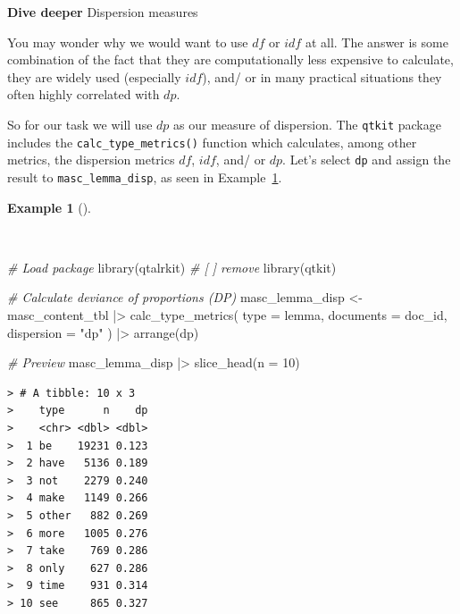 \documentclass[
  letterpaper,
]{latex/krantz}
\newenvironment{Shaded}{\begin{snugshade}}{\end{snugshade}}
\newcommand{\AttributeTok}[1]{\textcolor[rgb]{0.00,0.00,0.00}{#1}}
\newcommand{\CommentTok}[1]{\textcolor[rgb]{0.00,0.00,0.00}{\textit{#1}}}
\newcommand{\DecValTok}[1]{\textcolor[rgb]{0.00,0.00,0.00}{#1}}
\newcommand{\FunctionTok}[1]{\textcolor[rgb]{0.00,0.00,0.00}{#1}}
\newcommand{\NormalTok}[1]{\textcolor[rgb]{0.00,0.00,0.00}{#1}}
\newcommand{\OtherTok}[1]{\textcolor[rgb]{0.00,0.00,0.00}{#1}}
\newcommand{\SpecialCharTok}[1]{\textcolor[rgb]{0.00,0.00,0.00}{#1}}
\newcommand{\StringTok}[1]{\textcolor[rgb]{0.00,0.00,0.00}{#1}}
\theoremstyle{definition}
\newtheorem{example}{Example}[chapter]
\theoremstyle{remark}
\begin{document}
\begin{tcolorbox}[enhanced jigsaw, colframe=quarto-callout-color-frame, breakable, bottomrule=.15mm, arc=.35mm, left=2mm, opacityback=0, rightrule=.15mm, colback=white, toprule=.15mm, leftrule=.75mm]

\textbf{ Dive deeper} Dispersion measures

You may wonder why we would want to use \(df\) or \(idf\) at all. The
answer is some combination of the fact that they are computationally
less expensive to calculate, they are widely used (especially \(idf\)),
and/ or in many practical situations they often highly correlated with
\(dp\).

\end{tcolorbox}

So for our task we will use \(dp\) as our measure of dispersion. The
\texttt{qtkit} package includes the \texttt{calc\_type\_metrics()}
function which calculates, among other metrics, the dispersion metrics
\(df\), \(idf\), and/ or \(dp\). Let's select \texttt{dp} and assign the
result to \texttt{masc\_lemma\_disp}, as seen in
Example~\ref{exm-eda-masc-dp}.

\begin{example}[]\protect\hypertarget{exm-eda-masc-dp}{}\label{exm-eda-masc-dp}

~

\begin{Shaded}
\begin{Highlighting}[]
\CommentTok{\# Load package}
\FunctionTok{library}\NormalTok{(qtalrkit) }\CommentTok{\# [ ] remove}
\FunctionTok{library}\NormalTok{(qtkit)}

\CommentTok{\# Calculate deviance of proportions (DP)}
\NormalTok{masc\_lemma\_disp }\OtherTok{\textless{}{-}}
\NormalTok{  masc\_content\_tbl }\SpecialCharTok{|\textgreater{}}
  \FunctionTok{calc\_type\_metrics}\NormalTok{(}
    \AttributeTok{type =}\NormalTok{ lemma,}
    \AttributeTok{documents =}\NormalTok{ doc\_id,}
    \AttributeTok{dispersion =} \StringTok{"dp"}
\NormalTok{  ) }\SpecialCharTok{|\textgreater{}}
  \FunctionTok{arrange}\NormalTok{(dp)}

\CommentTok{\# Preview}
\NormalTok{masc\_lemma\_disp }\SpecialCharTok{|\textgreater{}}
  \FunctionTok{slice\_head}\NormalTok{(}\AttributeTok{n =} \DecValTok{10}\NormalTok{)}
\end{Highlighting}
\end{Shaded}

\begin{verbatim}
> # A tibble: 10 x 3
>    type      n    dp
>    <chr> <dbl> <dbl>
>  1 be    19231 0.123
>  2 have   5136 0.189
>  3 not    2279 0.240
>  4 make   1149 0.266
>  5 other   882 0.269
>  6 more   1005 0.276
>  7 take    769 0.286
>  8 only    627 0.286
>  9 time    931 0.314
> 10 see     865 0.327
\end{verbatim}

\end{example}
\end{document}
